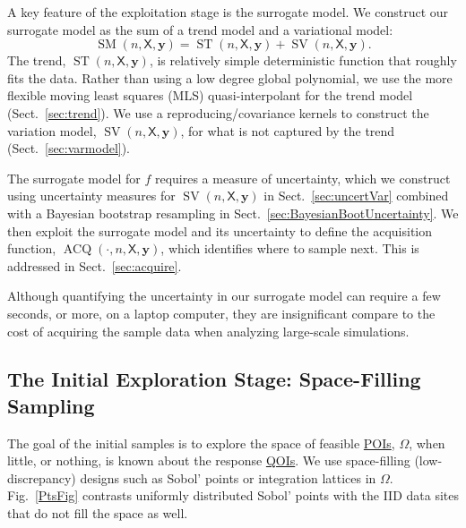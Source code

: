 \documentclass[11pt]{NSFamsart}
\newcommand{\QOIs}{\hyperlink{QOIlink}{QOIs}\xspace}
\newcommand{\POIs}{\hyperlink{POIlink}{POIs}\xspace}
\DeclareMathOperator{\SURR}{SM} %
\DeclareMathOperator{\STREND}{ST} %
\DeclareMathOperator{\SVAR}{SV} %
\DeclareMathOperator{\VAL}{ACQ}
\newcommand{\mX}{\mathsf{X}}
\newcommand{\by}{{\boldsymbol{y}}}
\begin{document}
A key feature of the exploitation stage is the surrogate model. We construct our surrogate model as the sum of a trend model and a variational model: 
\begin{equation*}
\SURR(n,\mX,\by) = \STREND(n,\mX,\by) + \SVAR(n,\mX,\by). 
\end{equation*} 
The trend, $\STREND(n,\mX,\by)$, is relatively simple deterministic function that roughly fits the data. Rather than using a low degree global polynomial, we use the more flexible moving least squares (MLS) quasi-interpolant for the trend model (Sect.\ \ref{sec:trend}). We use a reproducing/covariance kernels to construct the variation model, $\SVAR(n,\mX,\by)$, for what is not captured by the trend (Sect.\ \ref{sec:varmodel}). 

The surrogate model for $f$ requires a measure of uncertainty, which we construct using uncertainty measures for $\SVAR(n,\mX,\by)$ in Sect.\ \ref{sec:uncertVar} combined with a Bayesian bootstrap resampling in Sect.\ \ref{sec:BayesianBootUncertainty}. We then exploit the surrogate model and its uncertainty to define the acquisition function, $\VAL(\cdot, n,\mX,\by)$, which identifies where to sample next. This is addressed in Sect.\ \ref{sec:acquire}. 

Although quantifying the uncertainty in our surrogate model can require a few seconds, or more, on a laptop computer, they are insignificant compare to the cost of acquiring the sample data when analyzing large-scale simulations.   


\subsection{The Initial Exploration Stage: Space-Filling Sampling} \label{sec:Explore}

The goal of the initial samples is to explore the space of feasible \POIs, $\Omega$, when little, or nothing, is known about the response \QOIs. We use space-filling (low-discrepancy) designs such as Sobol' points \cite{DicPil10a} or integration lattices \cite{SloJoe94, DicEtal14a} in $\Omega$.  Fig.\ \ref{PtsFig} contrasts uniformly distributed Sobol' points with the IID data sites that do not fill the space as well.
\end{document}
